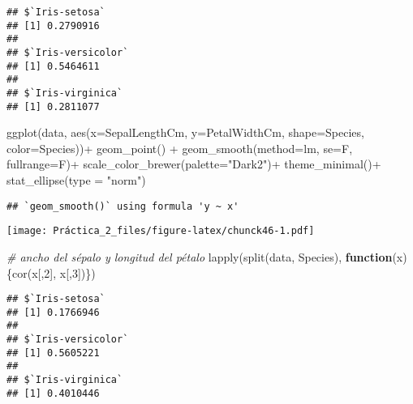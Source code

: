 \documentclass[
]{article}
\newenvironment{Shaded}{\begin{snugshade}}{\end{snugshade}}
\newcommand{\AttributeTok}[1]{\textcolor[rgb]{0.77,0.63,0.00}{#1}}
\newcommand{\CommentTok}[1]{\textcolor[rgb]{0.56,0.35,0.01}{\textit{#1}}}
\newcommand{\ControlFlowTok}[1]{\textcolor[rgb]{0.13,0.29,0.53}{\textbf{#1}}}
\newcommand{\DecValTok}[1]{\textcolor[rgb]{0.00,0.00,0.81}{#1}}
\newcommand{\FunctionTok}[1]{\textcolor[rgb]{0.00,0.00,0.00}{#1}}
\newcommand{\NormalTok}[1]{#1}
\newcommand{\SpecialCharTok}[1]{\textcolor[rgb]{0.00,0.00,0.00}{#1}}
\newcommand{\StringTok}[1]{\textcolor[rgb]{0.31,0.60,0.02}{#1}}
\begin{document}
\begin{verbatim}
## $`Iris-setosa`
## [1] 0.2790916
## 
## $`Iris-versicolor`
## [1] 0.5464611
## 
## $`Iris-virginica`
## [1] 0.2811077
\end{verbatim}

\begin{Shaded}
\begin{Highlighting}[]
\FunctionTok{ggplot}\NormalTok{(data, }\FunctionTok{aes}\NormalTok{(}\AttributeTok{x=}\NormalTok{SepalLengthCm, }\AttributeTok{y=}\NormalTok{PetalWidthCm, }\AttributeTok{shape=}\NormalTok{Species, }\AttributeTok{color=}\NormalTok{Species))}\SpecialCharTok{+}
  \FunctionTok{geom\_point}\NormalTok{() }\SpecialCharTok{+}
  \FunctionTok{geom\_smooth}\NormalTok{(}\AttributeTok{method=}\NormalTok{lm, }\AttributeTok{se=}\NormalTok{F, }\AttributeTok{fullrange=}\NormalTok{F)}\SpecialCharTok{+}
  \FunctionTok{scale\_color\_brewer}\NormalTok{(}\AttributeTok{palette=}\StringTok{"Dark2"}\NormalTok{)}\SpecialCharTok{+}
  \FunctionTok{theme\_minimal}\NormalTok{()}\SpecialCharTok{+}
  \FunctionTok{stat\_ellipse}\NormalTok{(}\AttributeTok{type =} \StringTok{"norm"}\NormalTok{)}
\end{Highlighting}
\end{Shaded}

\begin{verbatim}
## `geom_smooth()` using formula 'y ~ x'
\end{verbatim}

\texttt{[image: Práctica\_2\_files/figure-latex/chunck46-1.pdf]}

\begin{Shaded}
\begin{Highlighting}[]
\CommentTok{\# ancho del sépalo y longitud del pétalo}
\FunctionTok{lapply}\NormalTok{(}\FunctionTok{split}\NormalTok{(data, Species), }\ControlFlowTok{function}\NormalTok{(x)\{}\FunctionTok{cor}\NormalTok{(x[,}\DecValTok{2}\NormalTok{], x[,}\DecValTok{3}\NormalTok{])\})}
\end{Highlighting}
\end{Shaded}

\begin{verbatim}
## $`Iris-setosa`
## [1] 0.1766946
## 
## $`Iris-versicolor`
## [1] 0.5605221
## 
## $`Iris-virginica`
## [1] 0.4010446
\end{verbatim}
\end{document}
